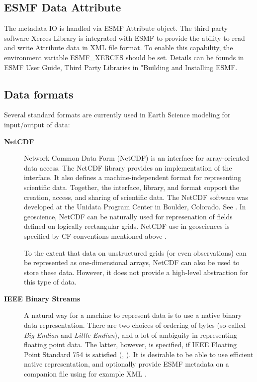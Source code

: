 \subsection{ESMF Data Attribute}

The metadata IO is handled via ESMF Attribute object. The third
party software Xerces Library is integrated with ESMF to provide
the ability to read and write Attribute data in XML file format.
To enable this capability, the environment variable ESMF_XERCES should be
set. Details can be founds in ESMF User Guide, Third Party Libraries
in "Building and Installing ESMF.


\subsection{Data formats}

Several standard formats are currently used in Earth Science modeling
for input/output of data:

\begin{description}
\item[\bf NetCDF] Network Common Data Form (NetCDF) is an interface for 
array-oriented data access. The NetCDF library provides an
implementation of the interface. It also defines a 
machine-independent format for representing scientific data. Together,
the interface, library, and format support the creation, access, and
sharing of scientific data. The NetCDF software was developed at the
Unidata Program Center in Boulder, Colorado. See \cite{NetCDF3_UsersGuide_C}.
In geoscience, NetCDF can be naturally used for represenation of fields 
defined on logically rectangular grids. NetCDF use in geosciences is 
specified by CF conventions mentioned above \cite{NetCDF_CF_v1_beta3}. 

To the extent that data on unstructured grids (or even observations) can be 
represented as one-dimensional arrays, NetCDF can also be used to store these 
data. However, it does not provide a high-level abstraction for this type of 
data. 

\item[\bf IEEE Binary Streams]
A natural way for a machine to represent data is to use a native
binary data representation. There are two choices of ordering of bytes
(so-called {\it Big Endian} and {\it Little Endian}), and a lot of
ambiguity in representing floating point data. The latter, however, is
specified, if IEEE Floating Point Standard 754 is satisfied
(\cite{IEEE-Floating-Point}, \cite{Kahan-IEEE-754}). It is desirable
to be able to use efficient native representation, and optionally
provide ESMF metadata on a companion file using for example XML
\cite{XML-W3C}.

\end{description}

